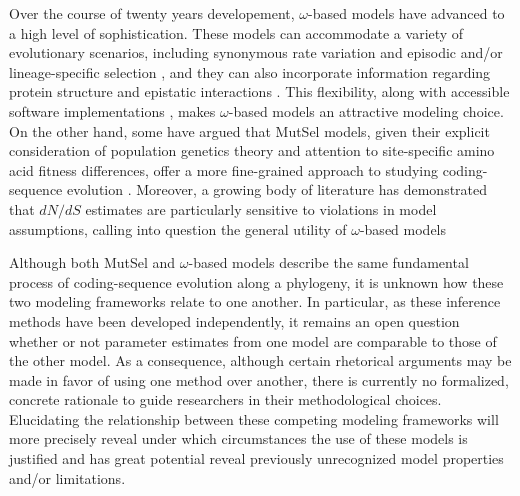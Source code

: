 \documentclass[11pt]{article}
\begin{document}
Over the course of twenty years developement, $\omega$-based models have advanced to a high level of sophistication. These models can accommodate a variety of evolutionary scenarios, including synonymous rate variation \cite{MuseGaut1994,KosakovskyPondMuse2005} and episodic \cite{KosakovskyPondetal2011,MEME} and/or lineage-specific selection \cite{YangNielsen2002,Zhangetal2005,KosakovskyPondFrost2005a}, and they can also incorporate information regarding protein structure and epistatic interactions \cite{Robinsonetal2003,Thorneetal2007,Rodrigueetal2009,Scherreretal2012,MeyerWilke2012}. This flexibility, along with accessible software implementations \cite{KosakovskyPondetal2005,Yang2007,Delport2010}, makes $\omega$-based models an attractive modeling choice. On the other hand, some have argued that MutSel models, given their explicit consideration of population genetics theory and attention to site-specific amino acid fitness differences, offer a more fine-grained approach to studying coding-sequence evolution \cite{HalpernBruno1998,Rodrigueetal2010,Tamurietal2012,Thorne2012}. Moreover, a growing body of literature has demonstrated that $dN/dS$ estimates are particularly sensitive to violations in model assumptions, calling into question the general utility of $\omega$-based models \cite{Rochaetal2006,KryazhimskiyPlotkin2008,Mugaletal2014}
		
Although both MutSel and $\omega$-based models describe the same fundamental process of coding-sequence evolution along a phylogeny, it is unknown how these two modeling frameworks relate to one another. In particular, as these inference methods have been developed independently, it remains an open question whether or not parameter estimates from one model are comparable to those of the other model. As a consequence, although certain rhetorical arguments may be made in favor of using one method over another, there is currently no formalized, concrete rationale to guide researchers in their methodological choices. Elucidating the relationship between these competing modeling frameworks will more precisely reveal under which circumstances the use of these models is justified and has great potential reveal previously unrecognized model properties and/or limitations.
		
\end{document}
